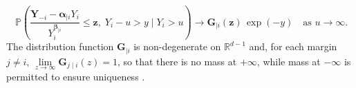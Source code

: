\documentclass[
  12pt]{article}
\DeclareMathOperator{\CE}{\mathrm{CE}}
\begin{document}
\begin{equation}~\label{eq:ce_limiting_dist}
  \mathbb{P}\!\left(
  \frac{\symbf{Y}_{-i} - \symbf{\alpha}_{\mid i} Y_{i}}
  {Y_{i}^{\symbf{\beta}_{\mid i}}}
  \le \symbf{z},\; 
  Y_i - u > y \;\Big|\; Y_i > u
  \right)
  \longrightarrow
  \symbf{G}_{\mid i}(\symbf{z})\,\exp{(-y)}
  \quad\text{as } u \to \infty.
\end{equation}
The distribution function $\symbf{G}_{\mid i}$ is non-degenerate on $\mathbb{R}^{d-1}$ and, for each margin $j\neq i$, $\lim\limits_{z\to\infty}\symbf{G}_{j\mid i}(z)=1$, so that there is no mass at $+\infty$, while mass at $-\infty$ is permitted to ensure uniqueness \citep{Keef2013}. 
\end{document}
